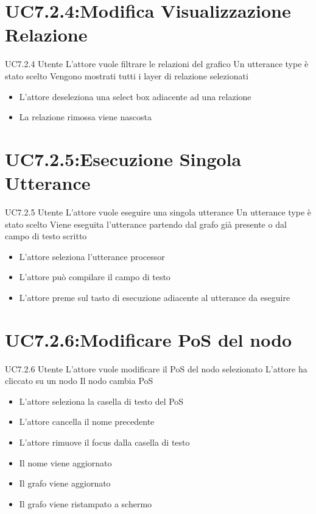 \documentclass[../AnalisideiRequisiti.tex]{subfiles}
\begin{document}
\section{UC7.2.4:Modifica Visualizzazione Relazione}
\UserCase
{UC7.2.4}
{Utente}
{}
{L'attore vuole filtrare le relazioni del grafico}
{Un utterance type è stato scelto }
{Vengono mostrati tutti i layer di relazione selezionati}
{}
{\begin{itemize}
		\item{} L'attore deseleziona una select box adiacente ad una relazione
		\item{} La relazione rimossa viene nascosta
\end{itemize}
}
\section{UC7.2.5:Esecuzione Singola Utterance}
\UserCase
{UC7.2.5}
{Utente}
{}
{L'attore vuole eseguire una singola utterance}
{Un utterance type è stato scelto  }
{Viene eseguita l'utterance partendo dal grafo già presente o dal campo di testo scritto}
{}
{\begin{itemize}
				\item{} L'attore seleziona l'utterance processor
		\item{} L'attore può compilare il campo di testo
		\item{} L'attore preme sul tasto di esecuzione adiacente al utterance da eseguire 
	\end{itemize}
}

\section{UC7.2.6:Modificare PoS del nodo}
\UserCase
{UC7.2.6}
{Utente}
{}
{L'attore vuole modificare il PoS del nodo selezionato}
{L'attore ha cliccato su un nodo}
{Il nodo cambia PoS}
{}
{\begin{itemize}
		\item{} L'attore seleziona la casella di testo del PoS
		\item{} L'attore cancella il nome precedente
		\item{} L'attore rimuove il focus dalla casella di testo
		\item{} Il nome viene aggiornato
		\item{} Il grafo viene aggiornato 
		\item{} Il grafo viene ristampato a schermo 
\end{itemize}}
\end{document}

